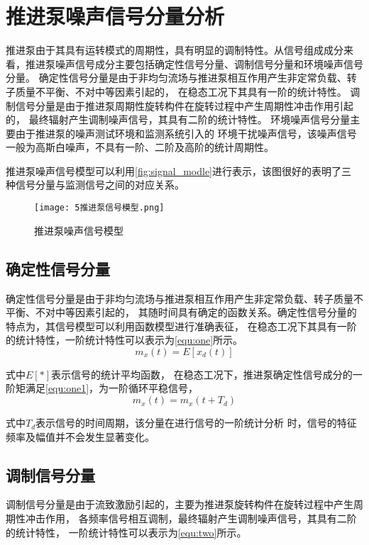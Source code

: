 \section{推进泵噪声信号分量分析}
推进泵由于其具有运转模式的周期性，具有明显的调制特性。从信号组成成分来看，推进泵噪声信号成分主要包括确定性信号分量、调制信号分量和环境噪声信号分量。
确定性信号分量是由于非均匀流场与推进泵相互作用产生非定常负载、转子质量不平衡、不对中等因素引起的，
在稳态工况下其具有一阶的统计特性。
调制信号分量是由于推进泵周期性旋转构件在旋转过程中产生周期性冲击作用引起的，
最终辐射产生调制噪声信号，其具有二阶的统计特性。
环境噪声信号分量主要由于推进泵的噪声测试环境和监测系统引入的
环境干扰噪声信号，该噪声信号一般为高斯白噪声，不具有一阶、二阶及高阶的统计周期性。

推进泵噪声信号模型可以利用\autoref{fig:signal_modle}进行表示，该图很好的表明了三
种信号分量与监测信号之间的对应关系。
\begin{figure}[htbp]
    \centering
    \texttt{[image: 5推进泵信号模型.png]}
    \caption{\label{fig:signal_modle}推进泵噪声信号模型}
\end{figure}

\subsection{确定性信号分量}
确定性信号分量是由于非均匀流场与推进泵相互作用产生非定常负载、转子质量不平衡、不对中等因素引起的，
其随时间具有确定的函数关系。确定性信号分量的特点为，其信号模型可以利用函数模型进行准确表征，
在稳态工况下其具有一阶的统计特性，一阶统计特性可以表示为\autoref{equ:one}所示。
\begin{equation}
    \label{equ:one}
    m_{x}\left ( t \right ) =E\left [ x_{d}\left ( t   \right )  \right ]
\end{equation}

式中$E[*]$表示信号的统计平均函数，
在稳态工况下，推进泵确定性信号成分的一阶矩满足\autoref{equ:one1}，为一阶循环平稳信号，
\begin{equation}
    \label{equ:one1}
    m_{x}\left ( t \right ) =m_{x}\left ( t+T_d \right )
\end{equation}

式中$T_{d}$表示信号的时间周期，该分量在进行信号的一阶统计分析
时，信号的特征频率及幅值并不会发生显著变化。
\subsection{调制信号分量}
调制信号分量是由于流致激励引起的，主要为推进泵旋转构件在旋转过程中产生周期性冲击作用，
各频率信号相互调制，最终辐射产生调制噪声信号，其具有二阶的统计特性，
一阶统计特性可以表示为\autoref{equ:two}所示。

